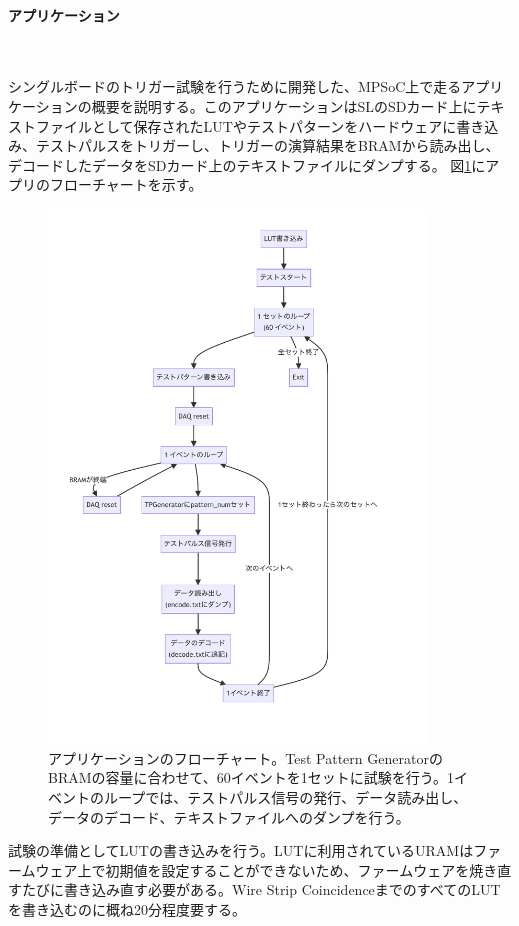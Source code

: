 \paragraph{アプリケーション}　　
\par
シングルボードのトリガー試験を行うために開発した、MPSoC上で走るアプリケーションの概要を説明する。このアプリケーションはSLのSDカード上にテキストファイルとして保存されたLUTやテストパターンをハードウェアに書き込み、テストパルスをトリガーし、トリガーの演算結果をBRAMから読み出し、デコードしたデータをSDカード上のテキストファイルにダンプする。
図\ref{Flowchart}にアプリのフローチャートを示す。

\begin{figure} 
\centering
\includegraphics[width=10cm]{fig/Test/Flowchart.pdf}
\caption[アプケーションのフローチャート]{アプリケーションのフローチャート。Test Pattern GeneratorのBRAMの容量に合わせて、60イベントを1セットに試験を行う。1イベントのループでは、テストパルス信号の発行、データ読み出し、データのデコード、テキストファイルへのダンプを行う。}
\label{Flowchart}
\end{figure}

試験の準備としてLUTの書き込みを行う。LUTに利用されているURAMはファームウェア上で初期値を設定することができないため、ファームウェアを焼き直すたびに書き込み直す必要がある。Wire Strip CoincidenceまでのすべてのLUTを書き込むのに概ね20分程度要する。

